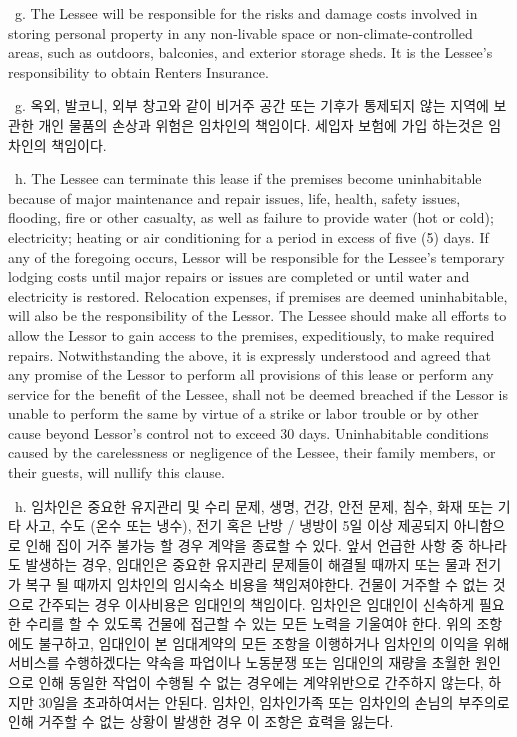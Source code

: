 \documentclass[10pt, letterpaper]{article}
\newcommand{\ul}[1]{\underline{\makebox[#1]{}}}
\newcommand{\init}{\ul{1cm}\ }
\begin{document}
\init g. The Lessee will be responsible for the risks and damage costs involved in storing personal property in any non-livable space or non-climate-controlled areas, such as outdoors, balconies, and exterior storage sheds. It is the Lessee's responsibility to obtain Renters Insurance.

\init g. 옥외, 발코니, 외부 창고와 같이 비거주 공간 또는 기후가 통제되지 않는 지역에 보관한 개인 물품의 손상과 위험은 임차인의 책임이다. 세입자 보험에 가입 하는것은 임차인의 책임이다.

\vspace{3pt}

\init h. The Lessee can terminate this lease if the premises become uninhabitable because of major maintenance and repair issues, life, health, safety issues, flooding, fire or other casualty, as well as failure to provide water (hot or cold); electricity; heating or air conditioning for a period in excess of five (5) days. If any of the foregoing occurs, Lessor will be responsible for the Lessee's temporary lodging costs until major repairs or issues are completed or until water and electricity is restored. Relocation expenses, if premises are deemed uninhabitable, will also be the responsibility of the Lessor. The Lessee should make all efforts to allow the Lessor to gain access to the premises, expeditiously, to make required repairs. Notwithstanding the above, it is expressly understood and agreed that any promise of the Lessor to perform all provisions of this lease or perform any service for the benefit of the Lessee, shall not be deemed breached if the Lessor is unable to perform the same by virtue of a strike or labor trouble or by other cause beyond Lessor's control not to exceed 30 days. Uninhabitable conditions caused by the carelessness or negligence of the Lessee, their family members, or their guests, will nullify this clause.

\init h. 임차인은 중요한 유지관리 및 수리 문제, 생명, 건강, 안전 문제, 침수, 화재 또는 기타 사고, 수도 (온수 또는 냉수), 전기 혹은 난방 / 냉방이 5일 이상 제공되지 아니함으로 인해 집이 거주 불가능 할 경우 계약을 종료할 수 있다. 앞서 언급한 사항 중 하나라도 발생하는 경우, 임대인은 중요한 유지관리 문제들이 해결될 때까지 또는 물과 전기가 복구 될 때까지 임차인의 임시숙소 비용을 책임져야한다. 건물이 거주할 수 없는 것으로 간주되는 경우 이사비용은 임대인의 책임이다. 임차인은 임대인이 신속하게 필요한 수리를 할 수 있도록 건물에 접근할 수 있는 모든 노력을 기울여야 한다. 위의 조항에도 불구하고, 임대인이 본 임대계약의 모든 조항을 이행하거나 임차인의 이익을 위해 서비스를 수행하겠다는 약속을 파업이나 노동분쟁 또는 임대인의 재량을 초월한 원인으로 인해 동일한 작업이 수행될 수 없는 경우에는 계약위반으로 간주하지 않는다, 하지만 30일을 초과하여서는 안된다. 임차인, 임차인가족 또는 임차인의 손님의 부주의로 인해 거주할 수 없는 상황이 발생한 경우 이 조항은 효력을 잃는다.
\end{document}
